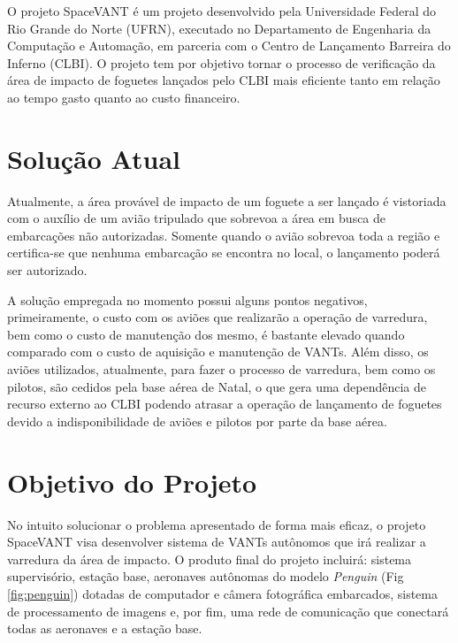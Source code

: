 \label{Cap:SpaceVANT}

O projeto SpaceVANT é um projeto desenvolvido pela Universidade Federal do Rio Grande do Norte (UFRN), executado no Departamento de Engenharia da Computação e Automação, em parceria com o Centro de Lançamento Barreira do Inferno (CLBI). O projeto tem por objetivo tornar o processo de verificação da área de impacto de foguetes lançados pelo CLBI mais eficiente tanto em relação ao tempo gasto quanto ao custo financeiro.

\section{Solução Atual}

Atualmente, a área provável de impacto de um foguete a ser lançado é vistoriada com o auxílio de um avião tripulado que sobrevoa a área em busca de embarcações não autorizadas. Somente quando o avião sobrevoa toda a região e certifica-se que nenhuma embarcação se encontra no local, o lançamento poderá ser autorizado.

A solução empregada no momento possui alguns pontos negativos, primeiramente, o custo com os aviões que realizarão a operação de varredura, bem como o custo de manutenção dos mesmo, é bastante elevado quando comparado com o custo de aquisição e manutenção de VANTs. Além disso, os aviões utilizados, atualmente, para fazer o processo de varredura, bem como os pilotos, são cedidos pela base aérea de Natal, o que gera uma dependência de recurso externo ao CLBI podendo atrasar a operação de lançamento de foguetes devido a indisponibilidade de aviões e pilotos por parte da base aérea. 

\section{Objetivo do Projeto}


No intuito solucionar o problema apresentado de forma mais eficaz, o projeto SpaceVANT visa desenvolver sistema de VANTs autônomos que irá realizar a varredura da área de impacto. O produto final do projeto incluirá: sistema supervisório, estação base, aeronaves autônomas do modelo \emph{Penguin} (Fig \ref{fig:penguin}) dotadas de computador e câmera fotográfica embarcados, sistema de processamento de imagens e, por fim, uma rede de comunicação que conectará todas as aeronaves e a estação base. 

